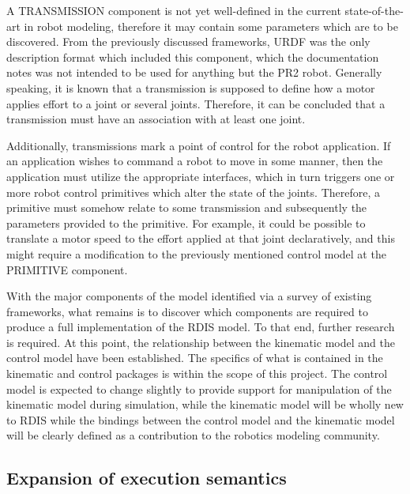 A TRANSMISSION component is not yet well-defined in the current state-of-the-art in robot modeling, therefore it may contain some parameters which are to be discovered. From the previously discussed frameworks, URDF was the only description format which included this component, which the documentation notes was not intended to be used for anything but the PR2 robot. Generally speaking, it is known that a transmission is supposed to define how a motor applies effort to a joint or several joints. Therefore, it can be concluded that a transmission must have an association with at least one joint.

Additionally, transmissions mark a point of control for the robot application. If an application wishes to command a robot to move in some manner, then the application must utilize the appropriate interfaces, which in turn triggers one or more robot control primitives which alter the state of the joints. Therefore, a primitive must somehow relate to some transmission and subsequently the parameters provided to the primitive. For example, it could be possible to translate a motor speed to the effort applied at that joint declaratively, and this might require a modification to the previously mentioned control model at the PRIMITIVE component. 

With the major components of the model identified via a survey of existing frameworks, what remains is to discover which components are required to produce a full implementation of the RDIS model. To that end, further research is required. At this point, the relationship between the kinematic model and the control model have been established. The specifics of what is contained in the kinematic and control packages is within the scope of this project. The control model is expected to change slightly to provide support for manipulation of the kinematic model during simulation, while the kinematic model will be wholly new to RDIS while the bindings between the control model and the kinematic model will be clearly defined as a contribution to the robotics modeling community.

\subsection{Expansion of execution semantics}

